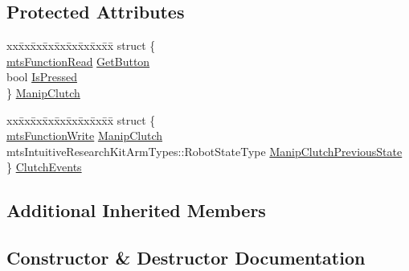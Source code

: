 \subsection*{Protected Attributes}
\begin{DoxyCompactItemize}
\item 
\begin{tabbing}
xx\=xx\=xx\=xx\=xx\=xx\=xx\=xx\=xx\=\kill
struct \{\\
\>\hyperlink{classmts_function_read}{mtsFunctionRead} \hyperlink{classmts_intuitive_research_kit_e_c_m_a544f7f8bbb4ab2a175c35bbb962d6768}{GetButton}\\
\>bool \hyperlink{classmts_intuitive_research_kit_e_c_m_ac3ab65996fefd2e479a066e543696e1c}{IsPressed}\\
\} \hyperlink{classmts_intuitive_research_kit_e_c_m_a77710f6874fc1274f33f1f04370d461c}{ManipClutch}\\

\end{tabbing}\item 
\begin{tabbing}
xx\=xx\=xx\=xx\=xx\=xx\=xx\=xx\=xx\=\kill
struct \{\\
\>\hyperlink{classmts_function_write}{mtsFunctionWrite} \hyperlink{classmts_intuitive_research_kit_e_c_m_abb5e805cd25cb99784ddf142e0b671c8}{ManipClutch}\\
\>mtsIntuitiveResearchKitArmTypes::RobotStateType \hyperlink{classmts_intuitive_research_kit_e_c_m_a8e17d129e26e3f66c71c4b128f1e8c44}{ManipClutchPreviousState}\\
\} \hyperlink{classmts_intuitive_research_kit_e_c_m_a341a7e439e566233586f3c858fcfbde3}{ClutchEvents}\\

\end{tabbing}\end{DoxyCompactItemize}
\subsection*{Additional Inherited Members}


\subsection{Constructor \& Destructor Documentation}
\hypertarget{classmts_intuitive_research_kit_e_c_m_a0c5ed41167c02448d560e8536f24f29f}{}

